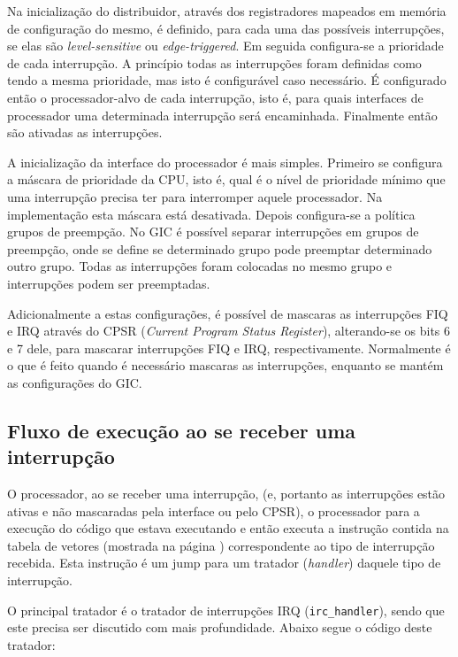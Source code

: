 \documentclass{ufscThesis/ufscThesis} %
\begin{document}
Na inicialização do distribuidor, através dos registradores mapeados em memória de configuração do mesmo, é definido, para cada uma das possíveis interrupções, se elas são \emph{level-sensitive} ou \emph{edge-triggered}.
Em seguida configura-se a prioridade de cada interrupção. A princípio todas as interrupções foram definidas como tendo a mesma prioridade, mas isto é configurável caso necessário.
É configurado então o processador-alvo de cada interrupção, isto é, para quais interfaces de processador uma determinada interrupção será encaminhada. Finalmente então são ativadas as interrupções.

A inicialização da interface do processador é mais simples. Primeiro se configura a máscara de prioridade da CPU, isto é, qual é o nível de prioridade mínimo que uma interrupção precisa ter para interromper aquele processador. Na implementação esta máscara está desativada. Depois configura-se a política grupos de preempção. No GIC é possível separar interrupções em grupos de preempção, onde se define se determinado grupo pode preemptar determinado outro grupo. Todas as interrupções foram colocadas no mesmo grupo e interrupções podem ser preemptadas.

Adicionalmente a estas configurações, é possível de mascaras as interrupções FIQ e IRQ através do CPSR (\emph{Current Program Status Register}), alterando-se os bits 6 e 7 dele, para mascarar interrupções FIQ e IRQ, respectivamente. Normalmente é o que é feito quando é necessário mascaras as interrupções, enquanto se mantém as configurações do GIC.

\subsection{Fluxo de execução ao se receber uma interrupção}

O processador, ao se receber uma interrupção, (e, portanto as interrupções estão ativas e não mascaradas pela interface ou pelo CPSR), o processador para a execução do código que estava executando e então executa a instrução contida na tabela de vetores (mostrada na página \pageref) correspondente ao tipo de interrupção recebida. Esta instrução é um jump para um tratador (\emph{handler}) daquele tipo de interrupção.

O principal tratador é o tratador de interrupções IRQ (\verb+irc_handler+), sendo que este precisa ser discutido com mais profundidade. Abaixo segue o código deste tratador:
\end{document}
